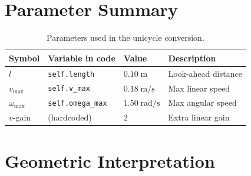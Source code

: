 \documentclass[11pt,a4paper]{article}
\newcommand{\vmax}{v_{\max}}
\newcommand{\wmax}{\omega_{\max}}
\begin{document}
\section{Parameter Summary}

\begin{table}[h]
\centering
\caption{Parameters used in the unicycle conversion.}
\begin{tabular}{llll}
\toprule
\textbf{Symbol} & \textbf{Variable in code} & \textbf{Value} & \textbf{Description}\\
\midrule
$l$       & \texttt{self.length}     & $0.10\;\text{m}$     & Look-ahead distance\\
$\vmax$   & \texttt{self.v\_max}     & $0.18\;\text{m/s}$   & Max linear speed\\
$\wmax$   & \texttt{self.omega\_max} & $1.50\;\text{rad/s}$ & Max angular speed\\
$v$-gain  & (hardcoded)              & $2$                  & Extra linear gain\\
\bottomrule
\end{tabular}
\label{tab:params}
\end{table}

\section{Geometric Interpretation}
\end{document}
